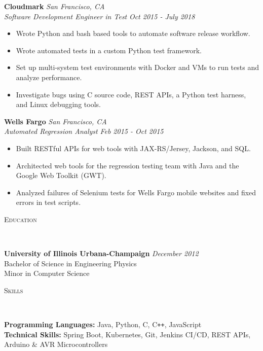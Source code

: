 \documentclass{article}
\newenvironment{changemargin}[2]{%
  \begin{list}{}{%
    \setlength{\topsep}{0pt}%
    \setlength{\leftmargin}{#1}%
    \setlength{\rightmargin}{#2}%
    \setlength{\listparindent}{\parindent}%
    \setlength{\itemindent}{\parindent}%
    \setlength{\parsep}{\parskip}%
  }%
  \item[]}{\end{list}
}
\newcommand{\lineover}{
	\begin{changemargin}{-0.05in}{-0.05in}
		\vspace*{-8pt}
		\hrulefill \\
		\vspace*{-2pt}
	\end{changemargin}
}
\newcommand{\header}[1]{
	\begin{changemargin}{-0.5in}{-0.5in}
		\scshape{#1}\\
  	\lineover
	\end{changemargin}
}
\newenvironment{body} {
	\vspace*{-16pt}
	\begin{changemargin}{-0.25in}{-0.5in}
  }	
	{\end{changemargin}
}
\begin{document}
\begin{body}
	\textbf{Cloudmark} \hfill \emph{San Francisco, CA}\\
	\emph{Software Development Engineer in Test} \hfill \emph{Oct 2015 - July 2018}\\
	\begin{itemize} \itemsep -0pt  %
	    \item Wrote Python and bash based tools to automate software release workflow.
		\item Wrote automated tests in a custom Python test framework.
		\item Set up multi-system test environments with Docker and VMs to run tests and analyze performance.
\item Investigate bugs using C source code, REST APIs, a Python test harness, and Linux debugging tools.
	\end{itemize}

	\textbf{Wells Fargo} \hfill \emph{San Francisco, CA}\\
	\emph{Automated Regression Analyst} \hfill \emph{Feb 2015 - Oct 2015}\\
	\begin{itemize} \itemsep -0pt  %
		\item Built RESTful APIs for web tools with JAX-RS/Jersey, Jackson, and SQL.
		\item Architected web tools for the regression testing team with Java and the Google Web Toolkit (GWT).
		\item Analyzed failures of Selenium tests for Wells Fargo mobile websites and fixed errors in test scripts.	
	\end{itemize}

\end{body}

\header{Education}
\vspace{14pt}
\begin{body}

	\textbf{University of Illinois Urbana-Champaign} \hfill \emph{December 2012}{} \\
	\hspace{4ex} Bachelor of Science in Engineering Physics \\
	\hspace{4ex} Minor in Computer Science\\
\end{body}

\header{Skills}

\begin{body}
	\vspace{14pt}
	\textbf{Programming Languages:}{} Java, Python, C, C{}\verb!++!, JavaScript\\%
	\textbf{Technical Skills:}{} Spring Boot, Kubernetes,  Git, Jenkins CI/CD, REST APIs, Arduino \& AVR Microcontrollers\\
\end{body}
\end{document}
